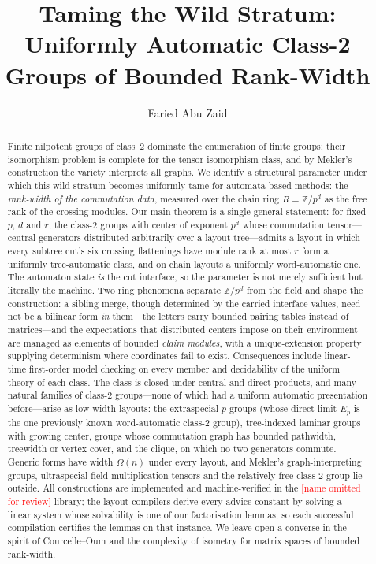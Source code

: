 \documentclass[a4paper,UKenglish,autoref,anonymous]{lipics-v2021}
\title{Taming the Wild Stratum: Uniformly Automatic Class-2 Groups of Bounded Rank-Width}
\author{Faried Abu Zaid}{Independent Researcher, Germany}{fariedaz@gmail.com}{}{}
\newcommand{\ZZ}{\mathbb{Z}}
\newcommand{\R}{R}                                   %
\newcommand{\AutStr}{\textcolor{red}{[name omitted for review]}}
\newcommand{\AutStr}{\textsf{AutStr}}
\begin{document}
\maketitle

\begin{abstract}
Finite nilpotent groups of class~$2$ dominate the enumeration of finite
groups; their isomorphism problem is complete for the tensor-isomorphism
class, and by Mekler's construction the variety interprets all graphs. We
identify a structural parameter under which this wild stratum becomes
uniformly tame for automata-based methods: the \emph{rank-width of the
commutation data}, measured over the chain ring $\R = \ZZ/p^d$ as the free
rank of the crossing modules. Our main theorem is a single general
statement: for fixed $p$, $d$ and $r$, the class-$2$ groups with center of
exponent $p^d$ whose commutation tensor---central generators distributed
arbitrarily over a layout tree---admits a layout in which every subtree
cut's six crossing flattenings have module rank at most $r$ form a
uniformly tree-automatic class, and on chain layouts a uniformly
word-automatic one. The automaton state \emph{is} the cut interface, so
the parameter is not merely sufficient but literally the machine.
Two ring phenomena separate $\ZZ/p^d$ from the field and shape the
construction: a sibling merge, though determined by the carried interface
values, need not be a bilinear form \emph{in} them---the letters carry
bounded pairing tables instead of matrices---and the expectations that
distributed centers impose on their environment are managed as elements
of bounded \emph{claim modules}, with a unique-extension property
supplying determinism where coordinates fail to exist.
Consequences include linear-time first-order model checking on every
member and decidability of the uniform theory of each class. The class is
closed under central and direct products, and many natural families of
class-$2$ groups---none of which had a uniform automatic presentation
before---arise as low-width layouts: the extraspecial $p$-groups (whose
direct limit $E_p$ is the one previously known word-automatic class-$2$
group), tree-indexed laminar groups with growing center, groups whose
commutation graph has bounded pathwidth, treewidth or vertex cover, and
the clique, on which no two generators commute. Generic forms have width
$\Omega(n)$ under every layout, and Mekler's graph-interpreting groups,
ultraspecial field-multiplication tensors and the relatively free
class-$2$ group lie outside. All constructions are implemented and machine-verified in the
\AutStr{} library; the layout compilers derive every advice constant by
solving a linear system whose solvability is one of our factorisation
lemmas, so each successful compilation certifies the lemmas on that
instance. We leave open a converse in the spirit of Courcelle--Oum and
the complexity of isometry for matrix spaces of bounded rank-width.
\end{abstract}
\end{document}
